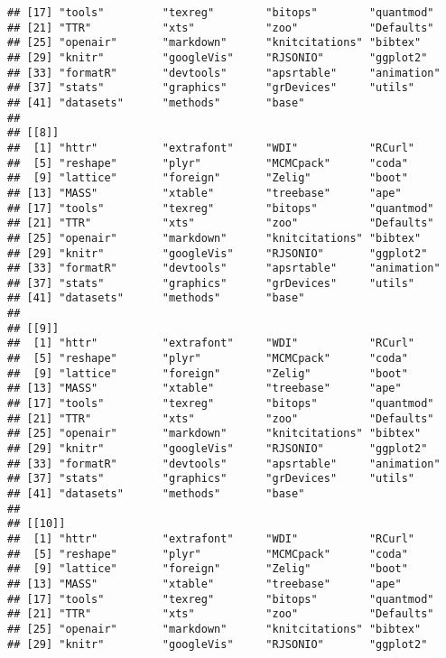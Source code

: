 \begin{knitrout}
\begin{kframe}
\begin{verbatim}
## [17] "tools"         "texreg"        "bitops"        "quantmod"     
## [21] "TTR"           "xts"           "zoo"           "Defaults"     
## [25] "openair"       "markdown"      "knitcitations" "bibtex"       
## [29] "knitr"         "googleVis"     "RJSONIO"       "ggplot2"      
## [33] "formatR"       "devtools"      "apsrtable"     "animation"    
## [37] "stats"         "graphics"      "grDevices"     "utils"        
## [41] "datasets"      "methods"       "base"         
## 
## [[8]]
##  [1] "httr"          "extrafont"     "WDI"           "RCurl"        
##  [5] "reshape"       "plyr"          "MCMCpack"      "coda"         
##  [9] "lattice"       "foreign"       "Zelig"         "boot"         
## [13] "MASS"          "xtable"        "treebase"      "ape"          
## [17] "tools"         "texreg"        "bitops"        "quantmod"     
## [21] "TTR"           "xts"           "zoo"           "Defaults"     
## [25] "openair"       "markdown"      "knitcitations" "bibtex"       
## [29] "knitr"         "googleVis"     "RJSONIO"       "ggplot2"      
## [33] "formatR"       "devtools"      "apsrtable"     "animation"    
## [37] "stats"         "graphics"      "grDevices"     "utils"        
## [41] "datasets"      "methods"       "base"         
## 
## [[9]]
##  [1] "httr"          "extrafont"     "WDI"           "RCurl"        
##  [5] "reshape"       "plyr"          "MCMCpack"      "coda"         
##  [9] "lattice"       "foreign"       "Zelig"         "boot"         
## [13] "MASS"          "xtable"        "treebase"      "ape"          
## [17] "tools"         "texreg"        "bitops"        "quantmod"     
## [21] "TTR"           "xts"           "zoo"           "Defaults"     
## [25] "openair"       "markdown"      "knitcitations" "bibtex"       
## [29] "knitr"         "googleVis"     "RJSONIO"       "ggplot2"      
## [33] "formatR"       "devtools"      "apsrtable"     "animation"    
## [37] "stats"         "graphics"      "grDevices"     "utils"        
## [41] "datasets"      "methods"       "base"         
## 
## [[10]]
##  [1] "httr"          "extrafont"     "WDI"           "RCurl"        
##  [5] "reshape"       "plyr"          "MCMCpack"      "coda"         
##  [9] "lattice"       "foreign"       "Zelig"         "boot"         
## [13] "MASS"          "xtable"        "treebase"      "ape"          
## [17] "tools"         "texreg"        "bitops"        "quantmod"     
## [21] "TTR"           "xts"           "zoo"           "Defaults"     
## [25] "openair"       "markdown"      "knitcitations" "bibtex"       
## [29] "knitr"         "googleVis"     "RJSONIO"       "ggplot2"      

\end{verbatim}
\end{kframe}
\end{knitrout}

